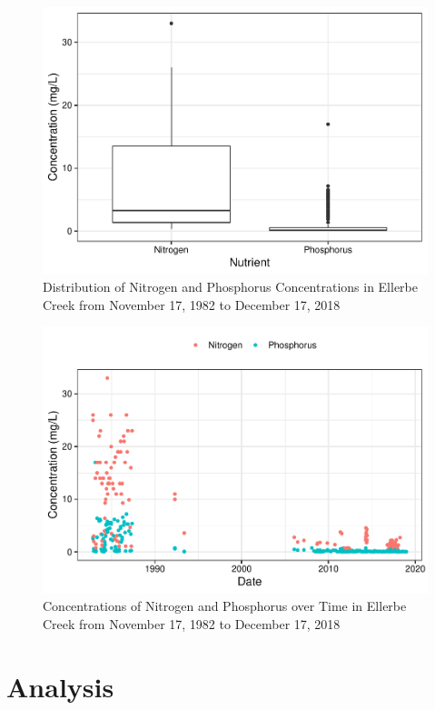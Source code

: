 \documentclass[12pt,]{article}
\begin{document}
\begin{figure}
\centering
\includegraphics{Landman_ENV872_Project_files/figure-latex/Exploratory Analysis Figure 4-1.pdf}
\caption{Distribution of Nitrogen and Phosphorus Concentrations in
Ellerbe Creek from November 17, 1982 to December 17, 2018}
\end{figure}

\newpage

\begin{figure}
\centering
\includegraphics{Landman_ENV872_Project_files/figure-latex/Exploratory Analysis Figure 5-1.pdf}
\caption{Concentrations of Nitrogen and Phosphorus over Time in Ellerbe
Creek from November 17, 1982 to December 17, 2018}
\end{figure}

\newpage

\hypertarget{analysis}{%
\section{Analysis}\label{analysis}}
\end{document}
